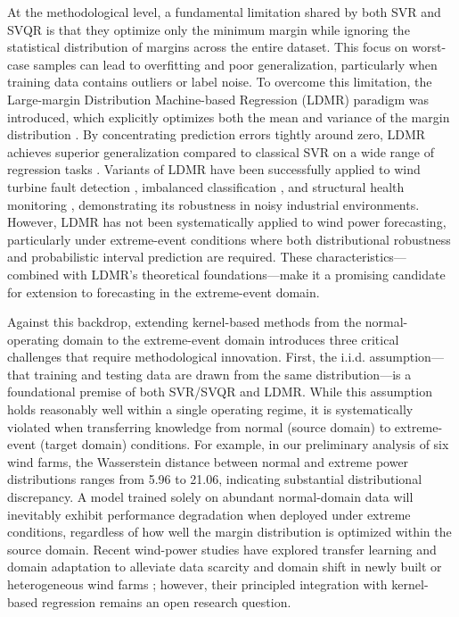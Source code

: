\documentclass[a4paper]{cas-sc}
\begin{document}
At the methodological level, a fundamental limitation shared by both SVR and SVQR is that they optimize only the minimum margin while ignoring the statistical distribution of margins across the entire dataset. This focus on worst-case samples can lead to overfitting and poor generalization, particularly when training data contains outliers or label noise. To overcome this limitation, the Large-margin Distribution Machine-based Regression (LDMR) paradigm was introduced, which explicitly optimizes both the mean and variance of the margin distribution \citep{zhang2019optimal, gupta2021least}. By concentrating prediction errors tightly around zero, LDMR achieves superior generalization compared to classical SVR on a wide range of regression tasks \citep{gupta2021least, hazarika2023mode}. Variants of LDMR have been successfully applied to wind turbine fault detection \citep{tang2019cost}, imbalanced classification \citep{CHENG2016107}, and structural health monitoring \citep{doi:10.1177/14759217231159948}, demonstrating its robustness in noisy industrial environments. However, LDMR has not been systematically applied to wind power forecasting, particularly under extreme-event conditions where both distributional robustness and probabilistic interval prediction are required. These characteristics---combined with LDMR's theoretical foundations---make it a promising candidate for extension to forecasting in the extreme-event domain.

Against this backdrop, extending kernel-based methods from the normal-operating domain to the extreme-event domain introduces three critical challenges that require methodological innovation. First, the i.i.d. assumption---that training and testing data are drawn from the same distribution---is a foundational premise of both SVR/SVQR and LDMR. While this assumption holds reasonably well within a single operating regime, it is systematically violated when transferring knowledge from normal (source domain) to extreme-event (target domain) conditions. For example, in our preliminary analysis of six wind farms, the Wasserstein distance between normal and extreme power distributions ranges from 5.96 to 21.06, indicating substantial distributional discrepancy. A model trained solely on abundant normal-domain data will inevitably exhibit performance degradation when deployed under extreme conditions, regardless of how well the margin distribution is optimized within the source domain. Recent wind-power studies have explored transfer learning and domain adaptation to alleviate data scarcity and domain shift in newly built or heterogeneous wind farms \citep{yin2021serioparallel, wang2024scarcity, dong2023mdan}; however, their principled integration with kernel-based regression remains an open research question.
\end{document}
